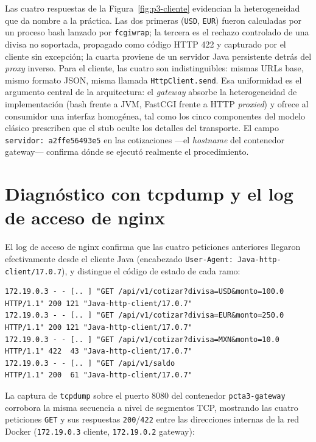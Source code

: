 Las cuatro respuestas de la Figura~\ref{fig:p3-cliente} evidencian la heterogeneidad que da nombre a la práctica. Las dos primeras (\texttt{USD}, \texttt{EUR}) fueron calculadas por un proceso bash lanzado por \texttt{fcgiwrap}; la tercera es el rechazo controlado de una divisa no soportada, propagado como código HTTP 422 y capturado por el cliente sin excepción; la cuarta proviene de un servidor Java persistente detrás del \emph{proxy} inverso. Para el cliente, las cuatro son indistinguibles: mismas URLs base, mismo formato JSON, misma llamada \texttt{HttpClient.send}. Esa uniformidad es el argumento central de la arquitectura: el \emph{gateway} absorbe la heterogeneidad de implementación (bash frente a JVM, FastCGI frente a HTTP \emph{proxied}) y ofrece al consumidor una interfaz homogénea, tal como los cinco componentes del modelo clásico prescriben que el stub oculte los detalles del transporte. El campo \texttt{servidor: a2ffe56493e5} en las cotizaciones —el \emph{hostname} del contenedor gateway— confirma dónde se ejecutó realmente el procedimiento.

\section{Diagnóstico con tcpdump y el log de acceso de nginx}

El log de acceso de nginx confirma que las cuatro peticiones anteriores llegaron efectivamente desde el cliente Java (encabezado \texttt{User-Agent: Java-http-client/17.0.7}), y distingue el código de estado de cada ramo:

\begin{lstlisting}
172.19.0.3 - - [.. ] "GET /api/v1/cotizar?divisa=USD&monto=100.0 HTTP/1.1" 200 121 "Java-http-client/17.0.7"
172.19.0.3 - - [.. ] "GET /api/v1/cotizar?divisa=EUR&monto=250.0 HTTP/1.1" 200 121 "Java-http-client/17.0.7"
172.19.0.3 - - [.. ] "GET /api/v1/cotizar?divisa=MXN&monto=10.0  HTTP/1.1" 422  43 "Java-http-client/17.0.7"
172.19.0.3 - - [.. ] "GET /api/v1/saldo                          HTTP/1.1" 200  61 "Java-http-client/17.0.7"
\end{lstlisting}

La captura de \texttt{tcpdump} sobre el puerto 8080 del contenedor \texttt{pcta3-gateway} corrobora la misma secuencia a nivel de segmentos TCP, mostrando las cuatro peticiones \texttt{GET} y sus respuestas \texttt{200}/\texttt{422} entre las direcciones internas de la red Docker (\texttt{172.19.0.3} cliente, \texttt{172.19.0.2} gateway):

